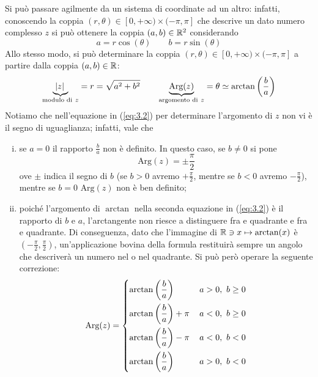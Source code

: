 Si può passare agilmente da un sistema di coordinate ad un altro: infatti, conoscendo la coppia $(r,\theta)\in[0, +\infty)\times (-\pi, \pi]$ che descrive un dato numero complesso $z$ si può ottenere la coppia $(a,b)\in\amsbb{R}^2$ considerando
\begin{equation}
    \label{eq:3.1}
    a=r\cos(\theta) \qquad b= r\sin(\theta)
\end{equation}
Allo stesso modo, si può determinare la coppia $(r,\theta)\in[0, +\infty)\times (-\pi, \pi]$ a partire dalla coppia $(a,b)\in\amsbb{R}$:
\begin{equation}
    \label{eq:3.2}
    \underbrace{\abs{z}}_{\text{modulo di} \ z} = r = \sqrt{a^2+b^2} \qquad \underbrace{\text{Arg}(z)}_{\text{argomento di} \ z} = \theta \simeq \arctan\left(\frac{b}{a}\right)
\end{equation}
Notiamo che nell'equazione in (\ref{eq:3.2}) per determinare l'argomento di $z$ non vi è il segno di uguaglianza; infatti, vale che
\begin{enumerate}[(i)]
    \item se $a=0$ il rapporto $\frac{b}{a}$ non è definito. In questo caso, se $b\ne 0$ si pone 
    \[
    \text{Arg}(z) = \pm \frac{\pi}{2}
    \]
    ove $\pm$ indica il segno di $b$ (se $b>0$ avremo $+\frac{\pi}{2}$, mentre se $b<0$ avremo $-\frac{\pi}{2}$), mentre se $b=0$ $\text{Arg}(z)$ non è ben definito;
    \item poiché l'argomento di $\arctan$ nella seconda equazione in (\ref{eq:3.2}) è il rapporto di $b$ e $a$, l'arctangente non riesce a distinguere fra \uppercase\expandafter{\relax} e \uppercase\expandafter{\relax} quadrante e fra \uppercase\expandafter{\relax} e \uppercase\expandafter{\relax} quadrante. Di conseguenza, dato che l'immagine di $\amsbb{R}\ni x \mapsto \arctan(x)$ è $\left(-\frac{\pi}{2}, \frac{\pi}{2}\right)$, un'applicazione bovina della formula restituirà sempre un angolo che descriverà un numero nel \uppercase\expandafter{\relax} o nel \uppercase\expandafter{\relax} quadrante. Si può però operare la seguente correzione:
    \[
    \text{Arg}(z) = \begin{dcases}
        \arctan\left(\frac{b}{a}\right)\, & a>0, \ b\ge 0\\
        \arctan\left(\frac{b}{a}\right)+\pi\, & a<0, \ b\ge 0\\
        \arctan\left(\frac{b}{a}\right)-\pi\, & a<0, \ b< 0\\
        \arctan\left(\frac{b}{a}\right)\, & a>0, \ b< 0
        \end{dcases}
    \]
\end{enumerate}
